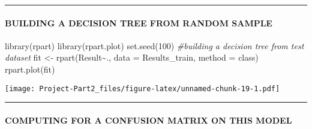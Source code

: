 \documentclass[
]{article}
\newenvironment{Shaded}{\begin{snugshade}}{\end{snugshade}}
\newcommand{\AttributeTok}[1]{\textcolor[rgb]{0.77,0.63,0.00}{#1}}
\newcommand{\CommentTok}[1]{\textcolor[rgb]{0.56,0.35,0.01}{\textit{#1}}}
\newcommand{\DecValTok}[1]{\textcolor[rgb]{0.00,0.00,0.81}{#1}}
\newcommand{\FunctionTok}[1]{\textcolor[rgb]{0.00,0.00,0.00}{#1}}
\newcommand{\NormalTok}[1]{#1}
\newcommand{\OtherTok}[1]{\textcolor[rgb]{0.56,0.35,0.01}{#1}}
\newcommand{\SpecialCharTok}[1]{\textcolor[rgb]{0.00,0.00,0.00}{#1}}
\newcommand{\StringTok}[1]{\textcolor[rgb]{0.31,0.60,0.02}{#1}}
\begin{document}
\begin{center}\rule{0.5\linewidth}{0.5pt}\end{center}

\hypertarget{building-a-decision-tree-from-random-sample}{%
\paragraph{\texorpdfstring{\textbf{BUILDING A DECISION TREE FROM RANDOM
SAMPLE}}{BUILDING A DECISION TREE FROM RANDOM SAMPLE}}\label{building-a-decision-tree-from-random-sample}}

\begin{Shaded}
\begin{Highlighting}[]
\FunctionTok{library}\NormalTok{(rpart)}
\FunctionTok{library}\NormalTok{(rpart.plot)}
\FunctionTok{set.seed}\NormalTok{(}\DecValTok{100}\NormalTok{)}
\CommentTok{\#building a decision tree from test dataset}
\NormalTok{fit }\OtherTok{\textless{}{-}} \FunctionTok{rpart}\NormalTok{(Result}\SpecialCharTok{\textasciitilde{}}\NormalTok{., }\AttributeTok{data =}\NormalTok{ Results\_train, }\AttributeTok{method =} \StringTok{\textquotesingle{}class\textquotesingle{}}\NormalTok{)}
\FunctionTok{rpart.plot}\NormalTok{(fit)}
\end{Highlighting}
\end{Shaded}

\texttt{[image: Project-Part2\_files/figure-latex/unnamed-chunk-19-1.pdf]}

\begin{center}\rule{0.5\linewidth}{0.5pt}\end{center}

\hypertarget{computing-for-a-confusion-matrix-on-this-model}{%
\paragraph{\texorpdfstring{\textbf{COMPUTING FOR A CONFUSION MATRIX ON
THIS
MODEL}}{COMPUTING FOR A CONFUSION MATRIX ON THIS MODEL}}\label{computing-for-a-confusion-matrix-on-this-model}}
\end{document}
